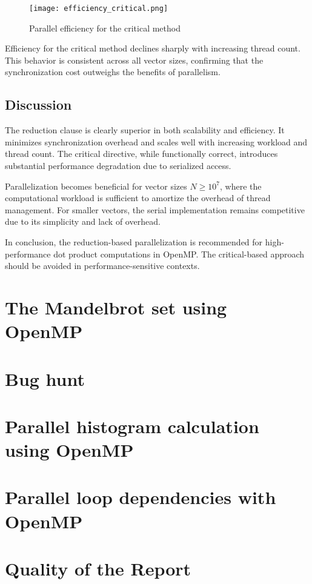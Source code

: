 \documentclass[unicode,11pt,a4paper,oneside,numbers=endperiod,openany]{scrartcl}
\begin{document}
\begin{figure}[h]
  \centering
  \texttt{[image: efficiency\_critical.png]}
  \caption{Parallel efficiency for the critical method}
\end{figure}

Efficiency for the critical method declines sharply with increasing thread count. This behavior is consistent across all vector sizes, confirming that the synchronization cost outweighs the benefits of parallelism.

\subsection*{Discussion}

The reduction clause is clearly superior in both scalability and efficiency. It minimizes synchronization overhead and scales well with increasing workload and thread count. The critical directive, while functionally correct, introduces substantial performance degradation due to serialized access.

Parallelization becomes beneficial for vector sizes $N \geq 10^7$, where the computational workload is sufficient to amortize the overhead of thread management. For smaller vectors, the serial implementation remains competitive due to its simplicity and lack of overhead.

In conclusion, the reduction-based parallelization is recommended for high-performance dot product computations in OpenMP. The critical-based approach should be avoided in performance-sensitive contexts.

\section{The Mandelbrot set using OpenMP }

\section{Bug hunt }

\section{Parallel histogram calculation using OpenMP }

\section{Parallel loop dependencies with OpenMP }

\section{Quality of the Report }
\end{document}
